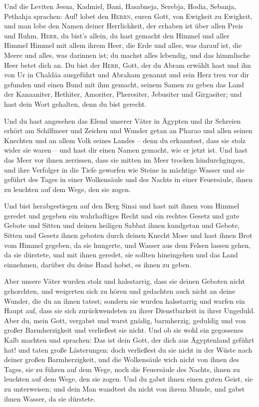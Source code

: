  Und die Leviten Jesua, Kadmiel, Bani, Hasabneja, Serebja,
Hodia, Sebanja, Pethahja sprachen: Auf! lobet den \textsc{Herrn}, euren
Gott, von Ewigkeit zu Ewigkeit, und man lobe den Namen deiner
Herrlichkeit, der erhaben ist über allen Preis und Ruhm. 
\textsc{Herr}, du bist's allein, du hast gemacht den Himmel und aller
Himmel Himmel mit allem ihrem Heer, die Erde und alles, was darauf ist,
die Meere und alles, was darinnen ist; du machst alles lebendig, und das
himmlische Heer betet dich an.  Du bist der \textsc{Herr},
Gott, der du Abram erwählt hast und ihn von Ur in Chaldäa ausgeführt und
Abraham genannt  und sein Herz treu vor dir gefunden und
einen Bund mit ihm gemacht, seinem Samen zu geben das Land der
Kanaaniter, Hethiter, Amoriter, Pheresiter, Jebusiter und Girgasiter;
und hast dein Wort gehalten, denn du bist gerecht.

 Und du hast angesehen das Elend unserer Väter in Ägypten
und ihr Schreien erhört am Schilfmeer  und Zeichen und
Wunder getan an Pharao und allen seinen Knechten und an allem Volk
seines Landes -- denn du erkanntest, dass sie stolz wider sie waren --
und hast dir einen Namen gemacht, wie er jetzt ist.  Und
hast das Meer vor ihnen zerrissen, dass sie mitten im Meer trocken
hindurchgingen, und ihre Verfolger in die Tiefe geworfen wie Steine in
mächtige Wasser  und sie geführt des Tages in einer
Wolkensäule und des Nachts in einer Feuersäule, ihnen zu leuchten auf
dem Wege, den sie zogen.

 Und bist herabgestiegen auf den Berg Sinai und hast mit
ihnen vom Himmel geredet und gegeben ein wahrhaftiges Recht und ein
rechtes Gesetz und gute Gebote und Sitten  und deinen
heiligen Sabbat ihnen kundgetan und Gebote, Sitten und Gesetz ihnen
geboten durch deinen Knecht Mose  und hast ihnen Brot vom
Himmel gegeben, da sie hungerte, und Wasser aus dem Felsen lassen gehen,
da sie dürstete, und mit ihnen geredet, sie sollten hineingehen und das
Land einnehmen, darüber du deine Hand hobst, es ihnen zu geben.

 Aber unsere Väter wurden stolz und halsstarrig, dass sie
deinen Geboten nicht gehorchten,  und weigerten sich zu
hören und gedachten auch nicht an deine Wunder, die du an ihnen tatest;
sondern sie wurden halsstarrig und warfen ein Haupt auf, dass sie sich
zurückwendeten zu ihrer Dienstbarkeit in ihrer Ungeduld. Aber du, mein
Gott, vergabst und warst gnädig, barmherzig, geduldig und von großer
Barmherzigkeit und verließest sie nicht.  Und ob sie wohl
ein gegossenes Kalb machten und sprachen: Das ist dein Gott, der dich
aus Ägyptenland geführt hat! und taten große Lästerungen:
 doch verließest du sie nicht in der Wüste nach deiner
großen Barmherzigkeit, und die Wolkensäule wich nicht von ihnen des
Tages, sie zu führen auf dem Wege, noch die Feuersäule des Nachts, ihnen
zu leuchten auf dem Wege, den sie zogen.  Und du gabst
ihnen einen guten Geist, sie zu unterweisen; und dein Man wandtest du
nicht von ihrem Munde, und gabst ihnen Wasser, da sie dürstete.

